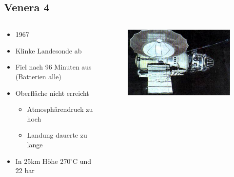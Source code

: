 \documentclass{beamer}
\begin{document}
	\subsection{Venera 4}
	\begin{frame}
		\begin{columns}
			\begin{column}{0.5\textwidth}
				\begin{itemize}
					\item 1967
					\item Klinke Landesonde ab
					\item Fiel nach 96 Minuten aus (Batterien alle)
					\item Oberfläche nicht erreicht
					\begin{itemize}
						\item Atmosphärendruck zu hoch
						\item Landung dauerte zu lange
					\end{itemize}
					\item In 25km Höhe 270$^\circ$C und 22 bar
				\end{itemize}
			\end{column}
			\begin{column}{0.4\textwidth}
				\begin{figure}[ht]
					\includegraphics[scale=0.4]{./images/venera_4}
				\end{figure}
			\end{column}
		\end{columns}
	\end{frame}
\end{document}
